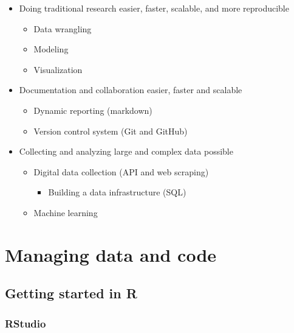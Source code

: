 \documentclass[
]{book}
\providecommand{\tightlist}{%
  \setlength{\itemsep}{0pt}\setlength{\parskip}{0pt}}
\begin{document}
\begin{itemize}
\tightlist
\item
  Doing traditional research easier, faster, scalable, and more reproducible

  \begin{itemize}
  \tightlist
  \item
    Data wrangling
  \item
    Modeling
  \item
    Visualization
  \end{itemize}
\item
  Documentation and collaboration easier, faster and scalable

  \begin{itemize}
  \tightlist
  \item
    Dynamic reporting (markdown)
  \item
    Version control system (Git and GitHub)
  \end{itemize}
\item
  Collecting and analyzing large and complex data possible

  \begin{itemize}
  \tightlist
  \item
    Digital data collection (API and web scraping)

    \begin{itemize}
    \tightlist
    \item
      Building a data infrastructure (SQL)
    \end{itemize}
  \item
    Machine learning
  \end{itemize}
\end{itemize}

\hypertarget{git_bash}{%
\chapter{Managing data and code}\label{git_bash}}

\hypertarget{getting-started-in-r}{%
\section{Getting started in R}\label{getting-started-in-r}}

\hypertarget{rstudio}{%
\subsection{RStudio}\label{rstudio}}
\end{document}
